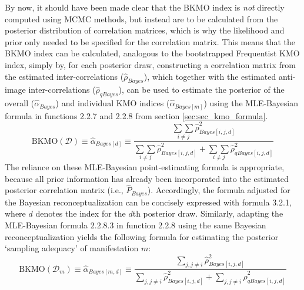 \documentclass[
  10pt,
  a4paper,
  twoside]{article}
\begin{document}
By now, it should have been made clear that the BKMO index is \emph{not} directly computed using MCMC methods, but instead are to be calculated from the posterior distribution of correlation matrices, which is why the likelihood and prior only needed to be specified for the correlation matrix. This means that the BKMO index can be calculated, analogous to the bootstrapped Frequentist KMO index, simply by, for each posterior draw, constructing a correlation matrix from the estimated inter-correlations (\(\hat{\rho}_{Bayes}\)), which together with the estimated anti-image inter-correlations (\(\hat{\rho}_{qBayes}\)), can be used to estimate the posterior of the overall (\(\hat{\alpha}_{Bayes}\)) and individual KMO indices (\(\hat{\alpha}_{Bayes[m]}\)) using the MLE-Bayesian formula in functions 2.2.7 and 2.2.8 from section \ref{sec:sec_kmo_formula}.
\[
\text{BKMO}(\mathcal{D}) \equiv \hat{\alpha}_{Bayes[d]} \equiv \frac{\underset{i \neq j}{\sum \sum} \hat{\rho}^2_{Bayes[i,j,d]}}{\underset{i \neq j}{\sum \sum} \hat{\rho}^2_{Bayes[i,j,d]} + \underset{i \neq j}{\sum \sum} \hat{\rho}_{qBayes[i,j,d]}^2}
\tag{3.2.1}
\]
The reliance on these MLE-Bayesian point-estimating formula is appropriate, because all prior information has already been incorporated into the estimated posterior correlation matrix (i.e., \(\hat{P}_{Bayes}\)). Accordingly, the formula adjusted for the Bayesian reconceptualization can be concisely expressed with formula 3.2.1, where \(d\) denotes the index for the \(d\)th posterior draw. Similarly, adapting the MLE-Bayesian formula 2.2.8.3 in function 2.2.8 using the same Bayesian reconceptualization yields the following formula for estimating the posterior `sampling adequacy' of manifestation \(m\):
\[
\text{BKMO}(\mathcal{D}_m) \equiv \hat{\alpha}_{Bayes[m,d]} \equiv \frac{\sum_{j, j \neq i} \hat{\rho}_{Bayes[i,j,d]}^2}{\sum_{j, j \neq i} \hat{\rho}_{Bayes[i,j,d]}^2 +\sum_{j, j \neq i} \hat{\rho}^2_{qBayes[i,j,d]}}
\tag{3.2.2}
\]
\end{document}

